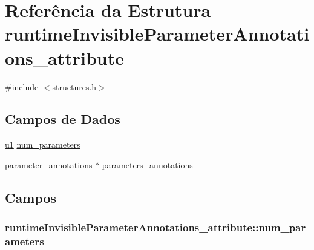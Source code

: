 \hypertarget{structruntimeInvisibleParameterAnnotations__attribute}{}\section{Referência da Estrutura runtime\+Invisible\+Parameter\+Annotations\+\_\+attribute}
\label{structruntimeInvisibleParameterAnnotations__attribute}


{\ttfamily \#include $<$structures.\+h$>$}

\subsection*{Campos de Dados}
\begin{DoxyCompactItemize}
\item 
\hyperlink{lista__operandos_8h_ad9f4cdb6757615aae2fad89dab3c5470}{u1} \hyperlink{structruntimeInvisibleParameterAnnotations__attribute_a9cd7cc3ab3d3b8992aacd54480384375}{num\+\_\+parameters}
\item 
\hyperlink{structparameter__annotations}{parameter\+\_\+annotations} $\ast$ \hyperlink{structruntimeInvisibleParameterAnnotations__attribute_a5e720df1952e818a4b5973aec115eade}{parameters\+\_\+annotations}
\end{DoxyCompactItemize}


\subsection{Campos}
\subsubsection[{\texorpdfstring{num\+\_\+parameters}{num_parameters}}]{ runtime\+Invisible\+Parameter\+Annotations\+\_\+attribute\+::num\+\_\+parameters}\hypertarget{structruntimeInvisibleParameterAnnotations__attribute_a9cd7cc3ab3d3b8992aacd54480384375}{}\label{structruntimeInvisibleParameterAnnotations__attribute_a9cd7cc3ab3d3b8992aacd54480384375}
